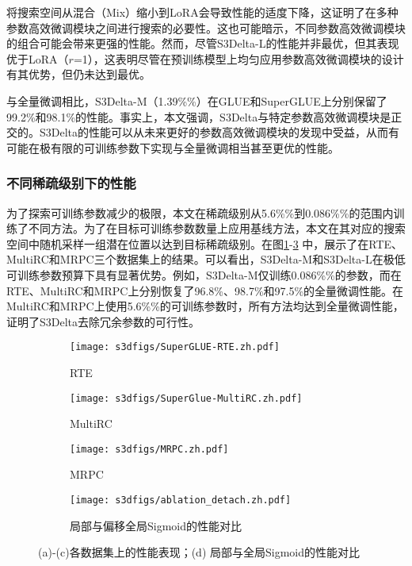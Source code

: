 将搜索空间从混合（Mix）缩小到LoRA会导致性能的适度下降，这证明了在多种参数高效微调模块之间进行搜索的必要性。这也可能暗示，不同参数高效微调模块的组合可能会带来更强的性能。然而，尽管S3Delta-L的性能并非最优，但其表现优于LoRA（$r$=1），这表明尽管在预训练模型上均匀应用参数高效微调模块的设计有其优势，但仍未达到最优。

与全量微调相比，S3Delta-M（1.39\%\%）在GLUE和SuperGLUE上分别保留了99.2\%和98.1\%的性能。事实上，本文强调，S3Delta与特定参数高效微调模块是正交的。S3Delta的性能可以从未来更好的参数高效微调模块的发现中受益，从而有可能在极有限的可训练参数下实现与全量微调相当甚至更优的性能。

\subsubsection{不同稀疏级别下的性能}
\label{sec:exp:sparsitylevel}
为了探索可训练参数减少的极限，本文在稀疏级别从5.6\%\%到0.086\%\%的范围内训练了不同方法。为了在目标可训练参数数量上应用基线方法，本文在其对应的搜索空间中随机采样一组潜在位置以达到目标稀疏级别。在图\ref{fig:case3}-\ref{fig:case5} 中，展示了在RTE、MultiRC和MRPC三个数据集上的结果。可以看出，S3Delta-M和S3Delta-L在极低可训练参数预算下具有显著优势。例如，S3Delta-M仅训练0.086\%\%的参数，而在RTE、MultiRC和MRPC上分别恢复了96.8\%、98.7\%和97.5\%的全量微调性能。在MultiRC和MRPC上使用5.6\%\%的可训练参数时，所有方法均达到全量微调性能，证明了S3Delta去除冗余参数的可行性。

\begin{figure}[htbp]
    \centering
    \begin{subfigure}[t]{0.48\textwidth}
      \centering
      \texttt{[image: s3dfigs/SuperGLUE-RTE.zh.pdf]}
      \caption{RTE}
      \label{fig:case3}
    \end{subfigure}%
    \hfill
    \begin{subfigure}[t]{0.48\textwidth}
      \centering
      \texttt{[image: s3dfigs/SuperGlue-MultiRC.zh.pdf]}
      \caption{MultiRC}
      \label{fig:case4}
    \end{subfigure}
    
    \vspace{0.5em} %
    
    \begin{subfigure}[t]{0.48\textwidth}
      \centering
      \texttt{[image: s3dfigs/MRPC.zh.pdf]}
      \caption{MRPC}
      \label{fig:case5}
    \end{subfigure}%
    \hfill
    \begin{subfigure}[t]{0.48\textwidth}
      \centering
      \texttt{[image: s3dfigs/ablation\_detach.zh.pdf]}
      \caption{局部与偏移全局Sigmoid的性能对比}
      \label{app:fig:detach}
    \end{subfigure}
    
    \caption{(a)-(c)各数据集上的性能表现；(d) 局部与全局Sigmoid的性能对比}
    \label{fig:combined}
  \end{figure}
  

